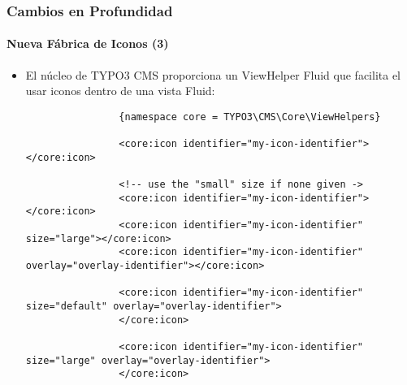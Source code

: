 \begin{frame}[fragile]
	\frametitle{Cambios en Profundidad}
	\framesubtitle{Nueva Fábrica de Iconos (3)}

	\lstset{basicstyle=\tiny\ttfamily}

	\begin{itemize}

		\item El núcleo de TYPO3 CMS proporciona un ViewHelper Fluid que facilita el usar iconos dentro de una vista Fluid:

			\begin{lstlisting}
				{namespace core = TYPO3\CMS\Core\ViewHelpers}

				<core:icon identifier="my-icon-identifier"></core:icon>

				<!-- use the "small" size if none given ->
				<core:icon identifier="my-icon-identifier"></core:icon>
				<core:icon identifier="my-icon-identifier" size="large"></core:icon>
				<core:icon identifier="my-icon-identifier" overlay="overlay-identifier"></core:icon>

				<core:icon identifier="my-icon-identifier" size="default" overlay="overlay-identifier">
				</core:icon>

				<core:icon identifier="my-icon-identifier" size="large" overlay="overlay-identifier">
				</core:icon>
			\end{lstlisting}

	\end{itemize}

\end{frame}



